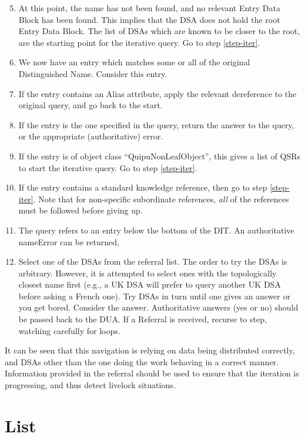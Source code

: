 \begin {enumerate}
\setcounter{enumi}{4}
\item
At this point, the name has not been found, and no relevant
Entry Data Block has been found.
This implies that the DSA does not hold the root Entry Data
Block.
The list of DSAs which are known
to be closer to the root, are the starting point for the
iterative query.
Go to step \ref{step-iter}.
\item 
We now have an entry which matches some or all of the original
Distinguished Name.
Consider this entry.
\item 
If the entry contains an Alias attribute, apply the relevant
dereference to the original query, and go back to the start.
\item 
If the entry is the one specified in the query, return the
answer to the query, or the appropriate (authoritative) error.
\item 
If the entry is of object class ``QuipuNonLeafObject'', 
this gives a list of QSRs to start the iterative query.
Go to step \ref{step-iter}.
\item
If the entry contains a standard knowledge reference, then
go to step \ref{step-iter}.  Note that for non-specific subordinate
references, {\em all} of the references must
be followed before giving up.
\item 
The query refers to an entry below the bottom of the DIT.
An authoritative nameError can be returned,
\item 
\label{step-iter}
Select one of the DSAs from the referral list.
The order to try the DSAs is arbitrary.
However, it is attempted to  select ones with the
topologically closest name first (e.g., a UK DSA will prefer to
query another UK DSA before asking a French one).
Try DSAs in turn until one gives an answer or you get bored.
Consider the answer.
Authoritative answers (yes or no) should be passed back to the
DUA.
If a Referral is received, recurse to step, watching
carefully for loops.
\end {enumerate}

It can be seen that this navigation is relying on data being
distributed correctly, and DSAs other than the one doing the
work behaving in a correct manner.
Information provided in the referral should be used to ensure that the
iteration is progressing, and thus detect livelock situations.



\section {List}

